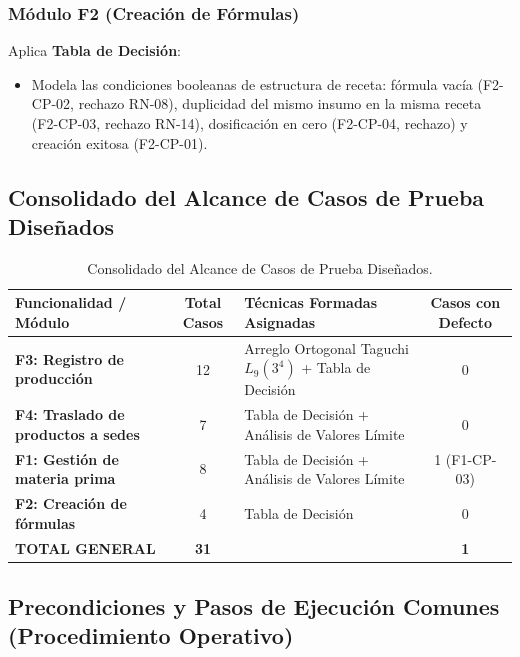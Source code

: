 \documentclass[11pt,a4paper]{article}
\begin{document}
\subsubsection{Módulo F2 (Creación de Fórmulas)}
Aplica \textbf{Tabla de Decisión}:
\begin{itemize}[noitemsep]
    \item Modela las condiciones booleanas de estructura de receta: fórmula vacía (F2-CP-02, rechazo RN-08), duplicidad del mismo insumo en la misma receta (F2-CP-03, rechazo RN-14), dosificación en cero (F2-CP-04, rechazo) y creación exitosa (F2-CP-01).
\end{itemize}

\subsection{Consolidado del Alcance de Casos de Prueba Diseñados}

\begin{table}[htbp]
\centering
\small
\begin{tabularx}{\textwidth}{p{4.2cm} c X c}
\toprule
\textbf{Funcionalidad / Módulo} & \textbf{Total Casos} & \textbf{Técnicas Formadas Asignadas} & \textbf{Casos con Defecto} \\
\midrule
\textbf{F3: Registro de producción} & 12 & Arreglo Ortogonal Taguchi $L_9(3^4)$ + Tabla de Decisión & 0 \\
\textbf{F4: Traslado de productos a sedes} & 7 & Tabla de Decisión + Análisis de Valores Límite & 0 \\
\textbf{F1: Gestión de materia prima} & 8 & Tabla de Decisión + Análisis de Valores Límite & 1 (F1-CP-03) \\
\textbf{F2: Creación de fórmulas} & 4 & Tabla de Decisión & 0 \\
\midrule
\textbf{TOTAL GENERAL} & \textbf{31} & & \textbf{1} \\
\bottomrule
\end{tabularx}
\caption{Consolidado del Alcance de Casos de Prueba Diseñados.}\label{tab:resumen_alcance}
\end{table}

\subsection{Precondiciones y Pasos de Ejecución Comunes (Procedimiento Operativo)}
\end{document}
